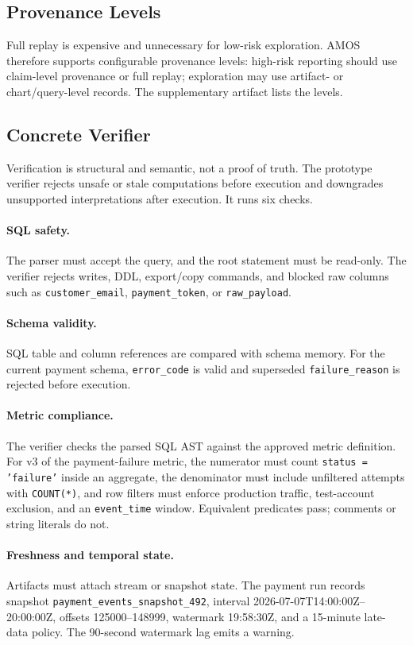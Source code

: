\documentclass[sigconf,nonacm]{acmart}
\newcommand{\amos}{\textsc{AMOS}\xspace}
\newcommand{\code}[1]{\texttt{#1}}
\begin{document}
\subsection{Provenance Levels}
Full replay is expensive and unnecessary for low-risk exploration. \amos therefore supports configurable provenance levels: high-risk reporting should use claim-level provenance or full replay; exploration may use artifact- or chart/query-level records. The supplementary artifact lists the levels.

\subsection{Concrete Verifier}
Verification is structural and semantic, not a proof of truth. The prototype verifier rejects unsafe or stale computations before execution and downgrades unsupported interpretations after execution. It runs six checks.

\paragraph{SQL safety.} The parser must accept the query, and the root statement must be read-only. The verifier rejects writes, DDL, export/copy commands, and blocked raw columns such as \code{customer\_email}, \code{payment\_token}, or \code{raw\_payload}.

\paragraph{Schema validity.} SQL table and column references are compared with schema memory. For the current payment schema, \code{error\_code} is valid and superseded \code{failure\_reason} is rejected before execution.

\paragraph{Metric compliance.} The verifier checks the parsed SQL AST against the approved metric definition. For v3 of the payment-failure metric, the numerator must count \code{status = 'failure'} inside an aggregate, the denominator must include unfiltered attempts with \code{COUNT(*)}, and row filters must enforce production traffic, test-account exclusion, and an \code{event\_time} window. Equivalent predicates pass; comments or string literals do not.

\paragraph{Freshness and temporal state.} Artifacts must attach stream or snapshot state. The payment run records snapshot \code{payment\_events\_snapshot\_492}, interval 2026-07-07T14:00:00Z--20:00:00Z, offsets 125000--148999, watermark 19:58:30Z, and a 15-minute late-data policy. The 90-second watermark lag emits a warning.
\end{document}
